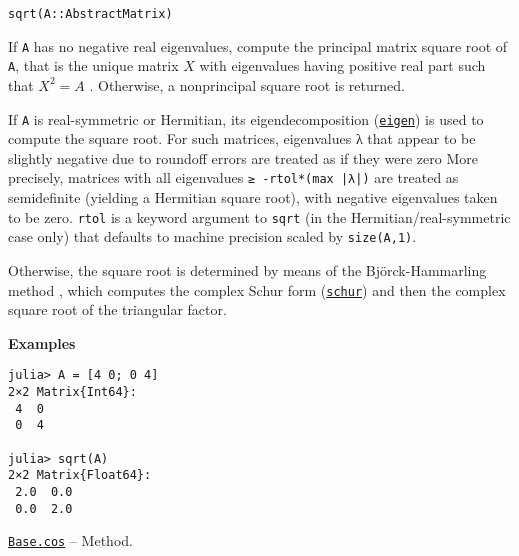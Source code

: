 \begin{adjustwidth}{2em}{0pt}


\begin{verbatim}
sqrt(A::AbstractMatrix)
\end{verbatim}

If \texttt{A} has no negative real eigenvalues, compute the principal matrix square root of \texttt{A}, that is the unique matrix  \(X\)  with eigenvalues having positive real part such that  \(X^2 = A\) . Otherwise, a nonprincipal square root is returned.

If \texttt{A} is real-symmetric or Hermitian, its eigendecomposition (\hyperlink{11056016707394839114}{\texttt{eigen}}) is used to compute the square root.   For such matrices, eigenvalues λ that appear to be slightly negative due to roundoff errors are treated as if they were zero More precisely, matrices with all eigenvalues \texttt{≥ -rtol*(max |λ|)} are treated as semidefinite (yielding a Hermitian square root), with negative eigenvalues taken to be zero. \texttt{rtol} is a keyword argument to \texttt{sqrt} (in the Hermitian/real-symmetric case only) that defaults to machine precision scaled by \texttt{size(A,1)}.

Otherwise, the square root is determined by means of the Björck-Hammarling method \footnotemark[11], which computes the complex Schur form (\hyperlink{17132870828407138368}{\texttt{schur}}) and then the complex square root of the triangular factor.

\textbf{Examples}


\begin{verbatim}
julia> A = [4 0; 0 4]
2×2 Matrix{Int64}:
 4  0
 0  4

julia> sqrt(A)
2×2 Matrix{Float64}:
 2.0  0.0
 0.0  2.0
\end{verbatim}



\end{adjustwidth}
\hypertarget{2791818139208864312}{}
\hyperlink{2791818139208864312}{\texttt{Base.cos}}  -- {Method.}

